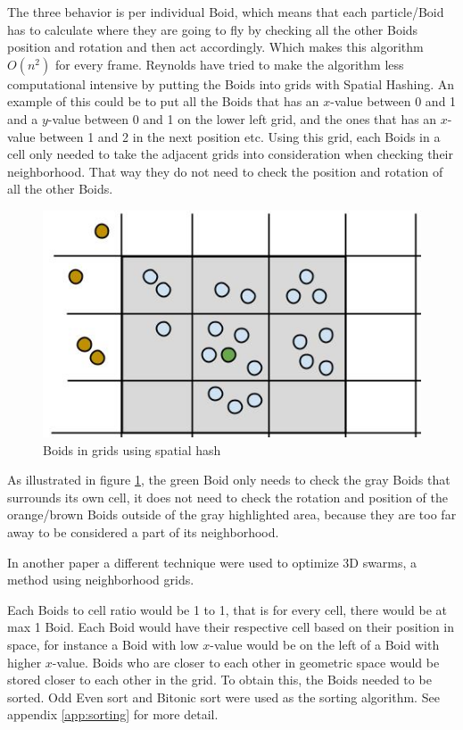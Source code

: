 The three behavior is per individual Boid, which means that each particle/Boid has to calculate where they are going to fly by checking all the other Boids position and rotation and then act accordingly. Which makes this algorithm $ O(n^2)$ for every frame. 
Reynolds have tried to make the algorithm less computational intensive by putting the Boids into grids with Spatial Hashing. An example of this could be to put all the Boids that has an $x$-value between 0 and 1 and a $y$-value between 0 and 1 on the lower left grid, and the ones that has an $x$-value between 1 and 2 in the next position etc. Using this grid, each Boids in a cell only needed to take the adjacent grids into consideration when checking their neighborhood. That way they do not need to check the position and rotation of all the other Boids.
\begin{figure}[h!]
    \centering
    \includegraphics[width=0.8\linewidth]{images/boid_spatialhash}
    \caption{Boids in grids using spatial hash} \label{fig:spatialhash}
\end{figure}
As illustrated in figure \ref{fig:spatialhash}, the green Boid only needs to check the gray Boids that surrounds its own cell, it does not need to check the rotation and position of the orange/brown Boids outside of the gray highlighted area, because they are too far away to be considered a part of its neighborhood.

In another paper \citep{Joselli2009} a different technique were used to optimize 3D swarms, a method using neighborhood grids.

Each Boids to cell ratio would be 1 to 1, that is for every cell, there would be at max 1 Boid. Each Boid would have their respective cell based on their position in space, for instance a Boid with low $x$-value would be on the left of a Boid with higher $x$-value. Boids who are closer to each other in geometric space would be stored closer to each other in the grid. To obtain this, the Boids needed to be sorted. Odd Even sort and Bitonic sort were used as the sorting algorithm. See appendix \ref{app:sorting} for more detail.

